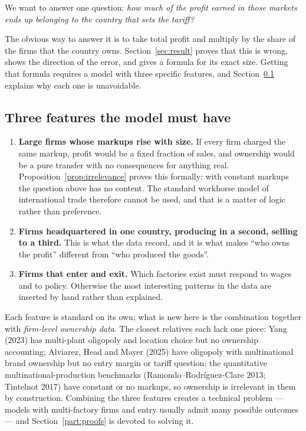 \documentclass[11pt]{article}
\theoremstyle{plain}
\theoremstyle{remark}
\theoremstyle{definition}
\begin{document}
We want to answer one question: \emph{how much of the profit earned in those markets
ends up belonging to the country that sets the tariff?}

The obvious way to answer it is to take total profit and multiply by the share of the
firms that the country owns. Section~\ref{sec:result} proves that this is wrong, shows the direction of
the error, and gives a formula for its exact size. Getting that formula requires a
model with three specific features, and Section~\ref{sec:three} explains why each one
is unavoidable.

\subsection{Three features the model must have}
\label{sec:three}

\begin{enumerate}
\item \textbf{Large firms whose markups rise with size.} If every firm charged the
same markup, profit would be a fixed fraction of sales, and ownership would be a pure
transfer with no consequences for anything real. Proposition~\ref{prop:irrelevance}
proves this formally: with constant markups the question above has no content. The
standard workhorse model of international trade therefore cannot be used, and that is
a matter of logic rather than preference.
\item \textbf{Firms headquartered in one country, producing in a second, selling to a
third.} This is what the data record, and it is what makes ``who owns the profit''
different from ``who produced the goods''.
\item \textbf{Firms that enter and exit.} Which factories exist must respond to wages
and to policy. Otherwise the most interesting patterns in the data are inserted by
hand rather than explained.
\end{enumerate}

\noindent Each feature is standard on its own; what is new here is the combination
together with \emph{firm-level ownership data}. The closest relatives each lack one
piece: Yang (2023) has multi-plant oligopoly and location choice but no ownership
accounting; Alviarez, Head and Mayer (2025) have oligopoly with multinational brand
ownership but no entry margin or tariff question; the quantitative multinational-production
benchmarks (Ramondo--Rodr\'iguez-Clare 2013; Tintelnot 2017) have constant or no markups,
so ownership is irrelevant in them by construction. Combining the three features creates
a technical problem --- models with multi-factory firms and entry usually admit many
possible outcomes --- and Section~\ref{part:proofs} is devoted to solving it.
\end{document}
